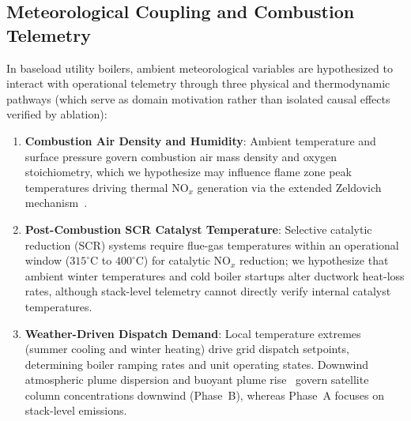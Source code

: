 \documentclass[conference]{IEEEtran}
\begin{document}
\subsection{Meteorological Coupling and Combustion Telemetry}
\label{sec:physics_coupling}
In baseload utility boilers, ambient meteorological variables are hypothesized to interact with operational telemetry through three physical and thermodynamic pathways (which serve as domain motivation rather than isolated causal effects verified by ablation):
\begin{enumerate}
    \item \textbf{Combustion Air Density and Humidity}: Ambient temperature and surface pressure govern combustion air mass density and oxygen stoichiometry, which we hypothesize may influence flame zone peak temperatures driving thermal $\text{NO}_x$ generation via the extended Zeldovich mechanism~\cite{beirle2019pinpointing}.
    \item \textbf{Post-Combustion SCR Catalyst Temperature}: Selective catalytic reduction (SCR) systems require flue-gas temperatures within an operational window ($315^\circ\text{C}$ to $400^\circ\text{C}$) for catalytic $\text{NO}_x$ reduction; we hypothesize that ambient winter temperatures and cold boiler startups alter ductwork heat-loss rates, although stack-level telemetry cannot directly verify internal catalyst temperatures.
    \item \textbf{Weather-Driven Dispatch Demand}: Local temperature extremes (summer cooling and winter heating) drive grid dispatch setpoints, determining boiler ramping rates and unit operating states. Downwind atmospheric plume dispersion and buoyant plume rise~\cite{defoy2015estimating,goldberg2022using} govern satellite column concentrations downwind (Phase~B), whereas Phase~A focuses on stack-level emissions.
\end{enumerate}
\end{document}
